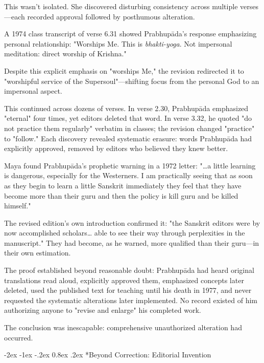 \documentclass[12pt,twoside]{book}
\makeatletter
\let\oldsubsection\subsection
\renewcommand{\subsection}[1]{\needspace{3\baselineskip}\oldsubsection{#1}}
\renewcommand\subsection{\@startsection{subsection}{2}{\z@}%
{-2ex \@plus -1ex \@minus -.2ex}%
{0.8ex \@plus .2ex}%
{\normalfont\large\bfseries}}
\makeatother
\begin{document}
This wasn't isolated. She discovered disturbing consistency across multiple verses—each recorded approval followed by posthumous alteration.

A 1974 class transcript of verse 6.31 showed Prabhupāda's response emphasizing personal relationship: "Worships Me. This is \emph{bhakti-yoga}. Not impersonal meditation: direct worship of Krishna."

Despite this explicit emphasis on "worships Me," the revision redirected it to "worshipful service of the Supersoul"—shifting focus from the personal God to an impersonal aspect.

This continued across dozens of verses. In verse 2.30, Prabhupāda emphasized "eternal" four times, yet editors deleted that word. In verse 3.32, he quoted "do not practice them regularly" verbatim in classes; the revision changed "practice" to "follow." Each discovery revealed systematic erasure: words Prabhupāda had explicitly approved, removed by editors who believed they knew better.

Maya found Prabhupāda's prophetic warning in a 1972 letter: "\ldots{}a little learning is dangerous, especially for the Westerners. I am practically seeing that as soon as they begin to learn a little Sanskrit immediately they feel that they have become more than their guru and then the policy is kill guru and be killed himself."

The revised edition's own introduction confirmed it: "the Sanskrit editors were by now accomplished scholars\ldots{} able to see their way through perplexities in the manuscript." They had become, as he warned, more qualified than their guru—in their own estimation.

The proof established beyond reasonable doubt: Prabhupāda had heard original translations read aloud, explicitly approved them, emphasized concepts later deleted, used the published text for teaching until his death in 1977, and never requested the systematic alterations later implemented. No record existed of him authorizing anyone to "revise and enlarge" his completed work.

The conclusion was inescapable: comprehensive unauthorized alteration had occurred.



\vspace{0.1cm}
\subsection*{Beyond Correction: Editorial Invention}
\end{document}

